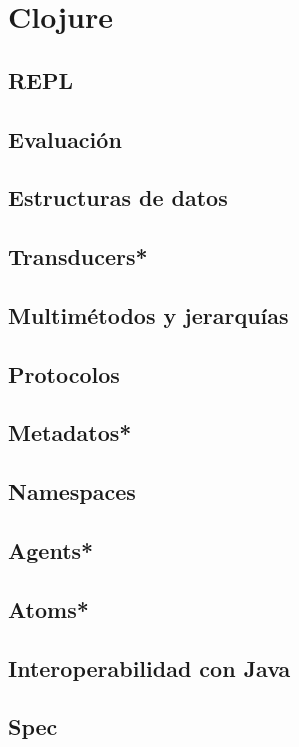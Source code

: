 \chapter{Clojure}
\label{cha:clojure}


\section{REPL}



\section{Evaluación}



\section{Estructuras de datos}


\section{Transducers*}


\section{Multimétodos y jerarquías}


\section{Protocolos}



\section{Metadatos*}



\section{Namespaces}



\section{Agents*}



\section{Atoms*}



\section{Interoperabilidad con Java}


\section{Spec}
